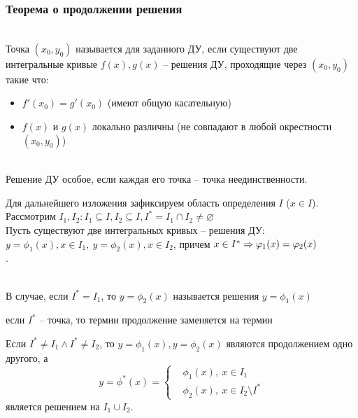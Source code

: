 \subsubsection{Теорема о продолжении решения}
\begin{Def}  \\
Точка $(x_0, y_0)$ называется  для заданного ДУ, если существуют две интегральные кривые $f(x), g(x)$ -- решения ДУ, проходящие через $(x_0, y_0)$ такие что:
\begin{itemize}
    \item $f'(x_0) = g'(x_0)$ (имеют общую касательную)
    \item $f(x)$ и $g(x)$ локально различны (не совпадают в любой окрестности $(x_0, y_0)$)
\end{itemize}
\end{Def}
\begin{Def}  \\
Решение ДУ особое, если каждая его точка -- точка неединственности.
\end{Def}
Для дальнейшего изложения зафиксируем область определения $I$ ($x \in I$). Рассмотрим $I_1, I_2 : I_1 \subseteq I, I_2 \subseteq I, I^* = I_1 \cap I_2 \neq \varnothing$ \\
Пусть существуют две интегральных кривых -- решения ДУ: $y = \phi_1(x), x \in I_1 ,~ y = \phi_2(x), x \in I_2$, причем $x \in I^* \Rightarrow \varphi_1(x) = \varphi_2(x)$\\.
\begin{Def}  \\
В случае, если $I^* = I_1$, то $y = \phi_2(x)$ называется  решения $y = \phi_1(x)$
\end{Def}
\begin{note}
если $I^*$ -- точка, то термин продолжение заменяется на термин 
\end{note}
\begin{note}
Если $I^* \neq I_1 \land I^* \neq I_2$, то $y = \phi_1(x), y = \phi_2(x)$ являются продолжением одно другого, а
\begin{equation}
    y = \phi^*(x) = \left\{ \begin{aligned}
    & \phi_1(x), ~  x \in I_1 \\
    & \phi_2(x), ~ x \in I_2 \setminus I^*
 \end{aligned} \right.
 \end{equation}
 является решением на $I_1 \cup I_2$.
\end{note}
